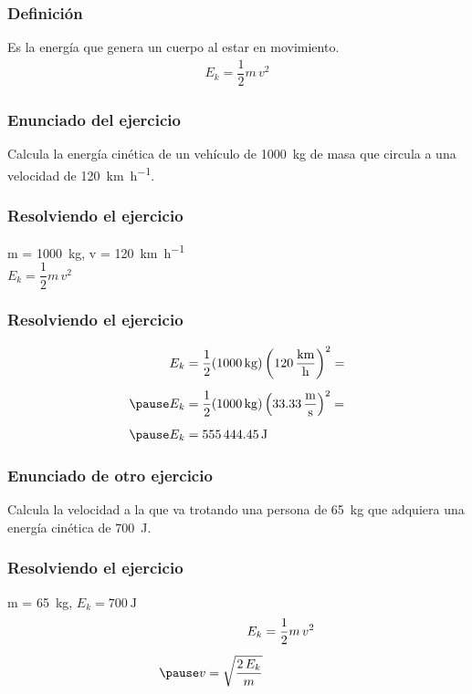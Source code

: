 \documentclass[14pt]{beamer}
\begin{document}
\begin{frame}
\frametitle{Definición}
Es la energía que genera un cuerpo al estar en movimiento.
\\
\bigskip
\pause
\begin{align*}
E_{k} = \dfrac{1}{2} m \, v^{2}
\end{align*}
\end{frame}
\begin{frame}
\frametitle{Enunciado del ejercicio}
Calcula la energía cinética de un vehículo de \SI{1000}{\kilo\gram} de masa que circula a una velocidad de \SI{120}{\kilo\meter\per\hour}.
\end{frame}
\begin{frame}
\frametitle{Resolviendo el ejercicio}
 \pause m = \SI{1000}{\kilo\gram}, \pause v = \SI{120}{\kilo\meter\per\hour}
\\
\bigskip
\pause
{} $E_{k} = \dfrac{1}{2} m \, v^{2}$
\end{frame}
\begin{frame}
\frametitle{Resolviendo el ejercicio}
\pause
\begin{eqnarray*}
\begin{aligned}
E_{k} &= \dfrac{1}{2} (\SI{1000}{\kilo\gram}) \left( \SI[per-mode=fraction]{120}{\kilo\meter\per\hour} \right)^{2} = \\[0.5em] \pause
E_{k} &= \dfrac{1}{2} (\SI{1000}{\kilo\gram}) \left( \SI[per-mode=fraction]{33.33}{\meter\per\second} \right)^{2} = \\[0.5em] \pause
E_{k} &= \SI{555444.45}{\joule}
\end{aligned}
\end{eqnarray*}
\end{frame}
\begin{frame}
\frametitle{Enunciado de otro ejercicio}
Calcula la velocidad a la que va trotando una persona de \SI{65}{\kilo\gram} que adquiera una energía cinética de \SI{700}{\joule}.
\end{frame}
\begin{frame}
\frametitle{Resolviendo el ejercicio}
 \pause m = \SI{65}{\kilo\gram}, \pause $E_{k} = \SI{700}{\joule}$
\\
\bigskip
\pause
{}
\begin{eqnarray*}
\begin{aligned}
E_{k} &= \dfrac{1}{2} m \, v^{2} \\[0.5em] \pause
v = \sqrt{\dfrac{2 \, E_{k}}{m}}
\end{aligned}
\end{eqnarray*}
\end{frame}
\end{document}
